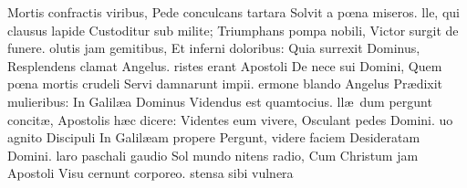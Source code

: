 \documentclass[letter,11pt]{book}
\begin{document}
\begin{multicols*}{2}
\newline \indent Mortis confractis viribus,
\newline \indent Pede conculcans tartara
\newline \indent Solvit a p\oe na miseros.
lle, qui clausus lapide
\newline \indent Custoditur sub milite;
\newline \indent Triumphans pompa nobili,
\newline \indent Victor surgit de funere.
olutis jam gemitibus,
\newline \indent Et inferni doloribus:
\newline \indent Quia surrexit Dominus,
\newline \indent Resplendens clamat Angelus.
ristes erant Apostoli
\newline \indent De nece sui Domini,
\newline \indent Quem p\oe na mortis crudeli
\newline \indent Servi damnarunt impii.
ermone blando Angelus
\newline \indent Pr\ae dixit mulieribus:
\newline \indent In Galil\ae a Dominus
\newline \indent Videndus est quamtocius.
ll\ae \ dum pergunt concit\ae ,
\newline \indent Apostolis h\ae c dicere:
\newline \indent Videntes eum vivere,
\newline \indent Osculant pedes Domini.
uo agnito Discipuli
\newline \indent In Galil\ae am propere
\newline \indent Pergunt, videre faciem
\newline \indent Desideratam Domini.
laro paschali gaudio
\newline \indent Sol mundo nitens radio,
\newline \indent Cum Christum jam Apostoli
\newline \indent Visu cernunt corporeo.
stensa sibi vulnera

\end{multicols*}
\end{document}
